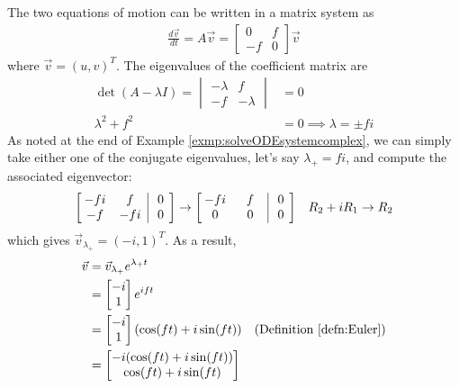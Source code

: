 \begin{solution}
The two equations of motion can be written in a matrix system as
\begin{align*}
\frac{d\vec{v}}{dt} = A\vec{v} =
\begin{bmatrix}
0 & f \\
-f & 0 
\end{bmatrix}
\vec{v}
\end{align*}
where $\vec{v} = (u,v)^T$. The eigenvalues of the coefficient matrix are
\begin{align*}
\det(A - \lambda I) = \begin{vmatrix}
-\lambda & f \\
-f & -\lambda
\end{vmatrix} &= 0 \\
\lambda^2 + f^2 &= 0 \implies \lambda = \pm fi 
\end{align*}
As noted at the end of Example \ref{exmp:solveODEsystemcomplex}, we can simply take either one of the conjugate eigenvalues, let's say $\lambda_+ = fi$, and compute the associated eigenvector:
\begin{align*}
\left[\begin{array}{@{\,}wc{18pt}wc{18pt}|wc{10pt}@{\,}}
-fi & f & 0 \\
-f & -fi & 0 \\
\end{array}\right] &\to
\left[\begin{array}{@{\,}wc{18pt}wc{18pt}|wc{10pt}@{\,}}
-fi & f & 0 \\
0 & 0 & 0 \\
\end{array}\right] & R_2 + i R_1 \to R_2
\end{align*}
which gives $\vec{v}_{\lambda_+} = (-i,1)^T$. As a result,
\begin{align*}
\vec{v} &= \vec{v}_{\lambda_+}e^{\lambda_+ t} \\
&= 
\begin{bmatrix}
-i \\
1
\end{bmatrix}
e^{i ft} \\
&= \begin{bmatrix}
-i \\
1
\end{bmatrix}
(\cos(ft) + i \sin(ft)) & \text{(Definition \ref{defn:Euler})}\\
&= 
\begin{bmatrix}
-i (\cos(ft) + i \sin(ft)) \\
\cos(ft) + i \sin(ft)

\end{bmatrix}
\end{align*}
\end{solution}
